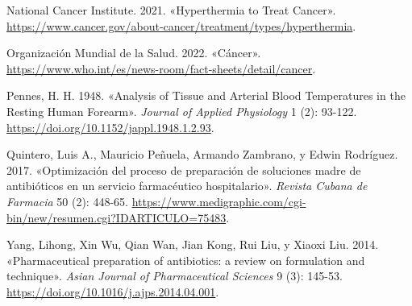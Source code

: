 \documentclass[
  spanish,
  us-letterpaper,
  DIV=11,
  numbers=noendperiod]{scrreprt}
\newlength{\cslhangindent}
\newenvironment{CSLReferences}[2] %
 {\begin{list}{}{%
  \setlength{\itemindent}{0pt}
  \setlength{\leftmargin}{0pt}
  \setlength{\parsep}{0pt}
  \ifodd #1
   \setlength{\leftmargin}{\cslhangindent}
   \setlength{\itemindent}{-1\cslhangindent}
  \fi
  \setlength{\itemsep}{#2\baselineskip}}}
 {\end{list}}
\begin{document}
\begin{CSLReferences}{1}{0}
National Cancer Institute. 2021. {«{Hyperthermia to Treat Cancer}»}.
\url{https://www.cancer.gov/about-cancer/treatment/types/hyperthermia}.

Organización Mundial de la Salud. 2022. {«{Cáncer}»}.
\url{https://www.who.int/es/news-room/fact-sheets/detail/cancer}.

Pennes, H. H. 1948. {«Analysis of Tissue and Arterial Blood Temperatures
in the Resting Human Forearm»}. \emph{Journal of Applied Physiology} 1
(2): 93-122. \url{https://doi.org/10.1152/jappl.1948.1.2.93}.

Quintero, Luis A., Mauricio Peñuela, Armando Zambrano, y Edwin
Rodríguez. 2017. {«Optimización del proceso de preparación de soluciones
madre de antibióticos en un servicio farmacéutico hospitalario»}.
\emph{Revista Cubana de Farmacia} 50 (2): 448-65.
\url{https://www.medigraphic.com/cgi-bin/new/resumen.cgi?IDARTICULO=75483}.

Yang, Lihong, Xin Wu, Qian Wan, Jian Kong, Rui Liu, y Xiaoxi Liu. 2014.
{«Pharmaceutical preparation of antibiotics: a review on formulation and
technique»}. \emph{Asian Journal of Pharmaceutical Sciences} 9 (3):
145-53. \url{https://doi.org/10.1016/j.ajps.2014.04.001}.

\end{CSLReferences}
\end{document}

